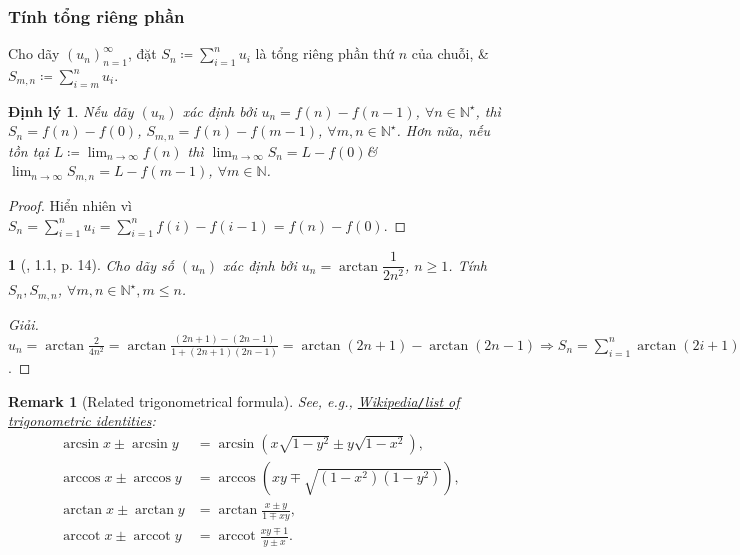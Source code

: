 \documentclass{article}
\newtheorem{baitoan}{}
\newtheorem{dinhly}{Định lý}
\newtheorem{remark}{Remark}
\begin{document}
\subsubsection{Tính tổng riêng phần}
Cho dãy $(u_n)_{n=1}^\infty$, đặt $S_n\coloneqq\sum_{i=1}^n u_i$ là tổng riêng phần thứ $n$ của chuỗi, \& $S_{m,n}\coloneqq\sum_{i=m}^n u_i$.

\begin{dinhly}
	Nếu dãy $(u_n)$ xác định bởi $u_n = f(n) - f(n - 1)$, $\forall n\in\mathbb{N}^\star$, thì $S_n = f(n) - f(0)$, $S_{m,n} = f(n) - f(m - 1)$, $\forall m,n\in\mathbb{N}^\star$. Hơn nữa, nếu tồn tại $L\coloneqq\lim_{n\to\infty} f(n)$ thì $\lim_{n\to\infty} S_n = L - f(0)$\& $\lim_{n\to\infty} S_{m,n} = L - f(m - 1)$, $\forall m\in\mathbb{N}$.
\end{dinhly}

\begin{proof}
	Hiển nhiên vì $S_n = \sum_{i=1}^n u_i = \sum_{i=1}^n f(i) - f(i - 1) = f(n) - f(0)$.
\end{proof}

\begin{baitoan}[\cite{Quoc_Long_Dat_Nam_VMC}, 1.1, p. 14]
	Cho dãy số $(u_n)$ xác định bởi $u_n = \arctan\dfrac{1}{2n^2}$, $n\ge1$. Tính $S_n,S_{m,n}$, $\forall m,n\in\mathbb{N}^\star,m\le n$.
\end{baitoan}

\begin{proof}[Giải]
	$u_n = \arctan\frac{2}{4n^2} = \arctan\frac{(2n + 1) - (2n - 1)}{1 + (2n + 1)(2n - 1)} = \arctan(2n + 1) - \arctan(2n - 1)\Rightarrow S_n = \sum_{i=1}^n \arctan(2i + 1) - \arctan(2i - 1) = \arctan(2n + 1) - \arctan1 = \arctan(2n + 1) - \frac{\pi}{4}$.
\end{proof}

\begin{remark}[Related trigonometrical formula]
	See, e.g., \href{https://en.wikipedia.org/wiki/List_of_trigonometric_identities}{Wikipedia{\tt/}list of trigonometric identities}:
	\begin{align*}
		\arcsin x\pm\arcsin y &= \arcsin(x\sqrt{1 - y^2}\pm y\sqrt{1 - x^2}),\\
		\arccos x\pm\arccos y &= \arccos\left(xy\mp\sqrt{(1 - x^2)(1 - y^2)}\right),\\
		\arctan x\pm\arctan y &= \arctan\frac{x\pm y}{1\mp xy},\\
		\operatorname{arccot}x\pm\operatorname{arccot}y &= \operatorname{arccot}\frac{xy\mp1}{y\pm x}.
	\end{align*}
\end{remark}
\end{document}
